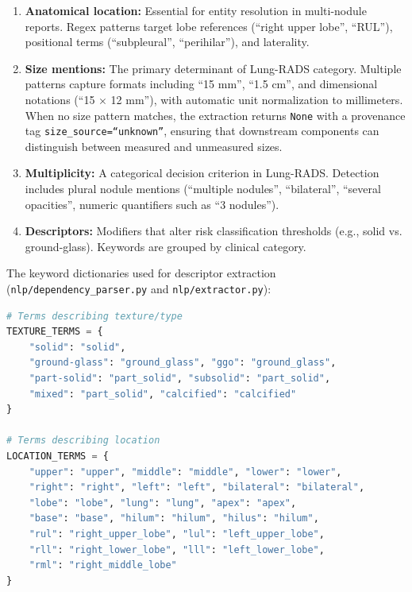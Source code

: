 \documentclass[12pt]{article}
\begin{document}
\begin{enumerate}
    \item \textbf{Anatomical location:} Essential for entity resolution in multi-nodule reports. Regex patterns target lobe references (``right upper lobe'', ``RUL''), positional terms (``subpleural'', ``perihilar''), and laterality.
    \item \textbf{Size mentions:} The primary determinant of Lung-RADS category. Multiple patterns capture formats including ``15 mm'', ``1.5 cm'', and dimensional notations (``15 $\times$ 12 mm''), with automatic unit normalization to millimeters. When no size pattern matches, the extraction returns \texttt{None} with a provenance tag \texttt{size\_source=``unknown''}, ensuring that downstream components can distinguish between measured and unmeasured sizes.
    \item \textbf{Multiplicity:} A categorical decision criterion in Lung-RADS. Detection includes plural nodule mentions (``multiple nodules'', ``bilateral'', ``several opacities'', numeric quantifiers such as ``3 nodules'').
    \item \textbf{Descriptors:} Modifiers that alter risk classification thresholds (e.g., solid vs. ground-glass). Keywords are grouped by clinical category.
\end{enumerate}

The keyword dictionaries used for descriptor extraction (\texttt{nlp/dependency\_parser.py} and \texttt{nlp/extractor.py}):

\begin{lstlisting}[language=Python, caption={Texture and location term dictionaries.}]
# Terms describing texture/type
TEXTURE_TERMS = {
    "solid": "solid",
    "ground-glass": "ground_glass", "ggo": "ground_glass",
    "part-solid": "part_solid", "subsolid": "part_solid",
    "mixed": "part_solid", "calcified": "calcified"
}

# Terms describing location
LOCATION_TERMS = {
    "upper": "upper", "middle": "middle", "lower": "lower",
    "right": "right", "left": "left", "bilateral": "bilateral",
    "lobe": "lobe", "lung": "lung", "apex": "apex",
    "base": "base", "hilum": "hilum", "hilus": "hilum",
    "rul": "right_upper_lobe", "lul": "left_upper_lobe",
    "rll": "right_lower_lobe", "lll": "left_lower_lobe",
    "rml": "right_middle_lobe"
}
\end{lstlisting}
\end{document}

